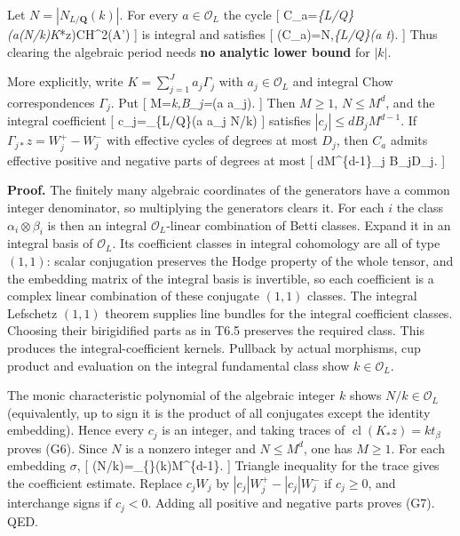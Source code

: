 \documentclass[11pt,a4paper]{article}
\theoremstyle{definition}
\begin{document}
Let \(N=|N_{L/\mathbf Q}(k)|\). For every \(a\in\mathcal O_L\) the cycle
{[}
C\_a=\emph{\{L/\mathbf Q\}\bigl(a(N/k)K}*z\bigr)\in CH\^{}2(A')
{]} is integral and satisfies {[}
(C\_a)=N,\emph{\{L/\mathbf Q\}(a
t}\beta).  {]} Thus clearing the algebraic period needs
\textbf{no analytic lower bound} for \(|k|\).

More explicitly, write \(K=\sum_{j=1}^J a_j\Gamma_j\) with
\(a_j\in\mathcal O_L\) and integral Chow correspondences \(\Gamma_j\).
Put {[}
M=\max\emph{\sigma\textbar{}\sigma k\textbar,\qquad B\_j=\max}\sigma\textbar{}\sigma(a
a\_j)\textbar. {]} Then \(M\ge1\), \(N\le M^d\), and the integral
coefficient {[} c\_j=\_\{L/\mathbf Q\}\bigl(a a\_j
N/k\bigr) {]} satisfies \(|c_j|\le d B_jM^{d-1}\). If
\(\Gamma_{j*}z=W_j^+-W_j^-\) with effective cycles of degrees at most
\(D_j\), then \(C_a\) admits effective positive and negative parts of
degrees at most {[} dM\^{}\{d-1\}\sum\_j B\_jD\_j.  {]}

\textbf{Proof.} The finitely many algebraic coordinates of the
generators have a common integer denominator, so multiplying the
generators clears it. For each \(i\) the class
\(\alpha_i\otimes\beta_i\) is then an integral \(\mathcal O_L\)-linear
combination of Betti classes. Expand it in an integral basis of
\(\mathcal O_L\). Its coefficient classes in integral cohomology are all
of type \((1,1)\): scalar conjugation preserves the Hodge property of
the whole tensor, and the embedding matrix of the integral basis is
invertible, so each coefficient is a complex linear combination of these
conjugate \((1,1)\) classes. The integral Lefschetz \((1,1)\) theorem
supplies line bundles for the integral coefficient classes. Choosing
their birigidified parts as in T6.5 preserves the required class. This
produces the integral-coefficient kernels. Pullback by actual morphisms,
cup product and evaluation on the integral fundamental class show
\(k\in\mathcal O_L\).

The monic characteristic polynomial of the algebraic integer \(k\) shows
\(N/k\in\mathcal O_L\) (equivalently, up to sign it is the product of
all conjugates except the identity embedding). Hence every \(c_j\) is an
integer, and taking traces of \(\operatorname{cl}(K_*z)=kt_\beta\)
proves (G6). Since \(N\) is a nonzero integer and \(N\le M^d\), one has
\(M\ge1\). For each embedding \(\sigma\), {[}
\textbar{}\sigma(N/k)\textbar=\prod\_\{\tau\ne\sigma\}\textbar{}\tau(k)\textbar{}\le M\^{}\{d-1\}.
{]} Triangle inequality for the trace gives the coefficient estimate.
Replace \(c_jW_j\) by \(|c_j|W_j^+-|c_j|W_j^-\) if \(c_j\ge0\), and
interchange signs if \(c_j<0\). Adding all positive and negative parts
proves (G7). QED.
\end{document}
